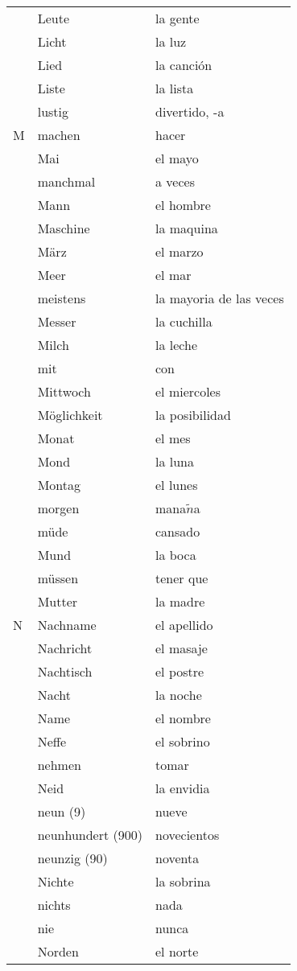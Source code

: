 \documentclass[10pt,spanish]{article}
\begin{document}
\begin{longtable}{p{} p{} | p{}}
& Leute & la gente \\
& Licht & la luz \\
& Lied & la canción \\
& Liste & la lista \\
& lustig & divertido, -a\\
M & machen & hacer  \\
& Mai & el mayo  \\
& manchmal & a veces  \\
& Mann & el hombre  \\
& Maschine & la maquina\\
& März & el marzo  \\
& Meer & el mar  \\
& meistens & la mayoria de las veces  \\
& Messer & la cuchilla  \\
& Milch & la leche  \\
& mit & con  \\
& Mittwoch & el miercoles  \\
& Möglichkeit & la posibilidad  \\
& Monat & el mes  \\
& Mond & la luna  \\
& Montag & el lunes  \\
& morgen & mana$\tilde{n}$a \\
& müde & cansado  \\
& Mund & la boca  \\
& müssen & tener que \\
& Mutter & la madre  \\
N & Nachname & el apellido  \\
& Nachricht & el masaje  \\
& Nachtisch & el postre  \\
& Nacht & la noche  \\
& Name & el nombre  \\
& Neffe & el sobrino  \\
& nehmen & tomar  \\
& Neid & la envidia \\
& neun (9) & nueve  \\
& neunhundert (900) & novecientos  \\
& neunzig (90) & noventa  \\
& Nichte & la sobrina  \\
& nichts & nada \\
& nie & nunca  \\
& Norden & el norte  \\

\end{longtable}
\end{document}
